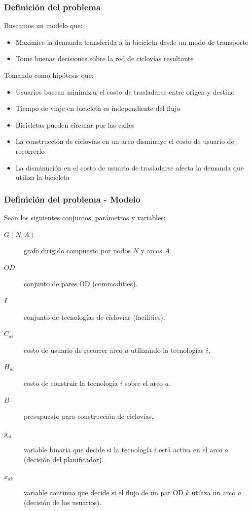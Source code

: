 \documentclass[aspectratio=43, 10pt]{beamer}
\begin{document}
\begin{frame}
    \frametitle{Definición del problema}

    Buscamos un modelo que:

    \begin{itemize}
        \item{Maximice la demanda transferida a la bicicleta desde un modo de transporte}
        \item{Tome buenas decisiones sobre la red de ciclovías resultante}
    \end{itemize}

    Tomando como hipótesis que:

    \begin{itemize}
        \item{Usuarios buscan minimizar el costo de trasladarse entre origen y destino}
        \item{Tiempo de viaje en bicicleta es independiente del flujo}
        \item{Bicicletas pueden circular por las calles}
        \item{La construcción de ciclovías en un arco disminuye el costo de usuario de recorrerlo}
        \item{La disminución en el costo de usuario de trasladarse afecta la demanda que utiliza la bicicleta}
    \end{itemize}
\end{frame}

\begin{frame}
    \frametitle{Definición del problema - Modelo}

    Sean los siguientes conjuntos, parámetros y variables:

    \begin{description}
        \item[$G(N,A)$] grafo dirigido compuesto por nodos $N$ y arcos $A$.
        \item[$OD$] conjunto de pares OD (commodities).
        \item[$I$] conjunto de tecnologías de ciclovías (facilities).
        \item[$C_{ai}$] costo de usuario de recorrer arco $a$ utilizando la tecnologías $i$.
        \item[$H_{ai}$] costo de construir la tecnología $i$ sobre el arco $a$.
        \item[$B$] presupuesto para construcción de ciclovías.
        \item[$y_{ai}$] variable binaria que decide si la tecnología $i$ está activa en el arco $a$ (decisión del planificador).
        \item[$x_{ak}$] variable continua que decide si el flujo de un par OD $k$ utiliza un arco $a$ (decisión de los usuarios).
    \end{description}
\end{frame}
\end{document}
